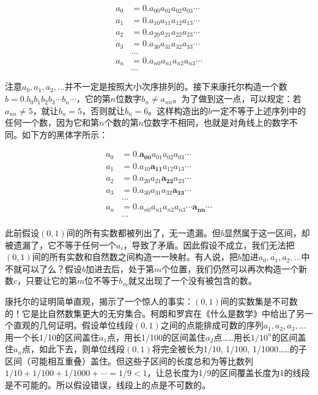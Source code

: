 \documentclass[b5paper]{ctexart}
\begin{document}
\begin{align*}
a_0 &= 0.a_{00}a_{01}a_{02}a_{03}\dotsm\\
a_1 &= 0.a_{10}a_{11}a_{12}a_{13}\dotsm\\
a_2 &= 0.a_{20}a_{21}a_{22}a_{23}\dotsm\\
a_3 &= 0.a_{30}a_{31}a_{32}a_{33}\dotsm\\
    &\dotso \\
a_n &= 0.a_{n0}a_{n1}a_{n2}a_{n3}\dotsm\\
    &\dotso
\end{align*}

注意$a_0, a_1, a_2, \dotsc$并不一定是按照大小次序排列的。接下来康托尔构造一个数$b = 0.b_0b_1b_2b_3 \dotsm b_n \dotsm$，它的第$n$位数字$b_n \neq a_{nn}$。为了做到这一点，可以规定：若$a_{nn} \neq 5$，就让$b_n = 5$，否则就让$b_n = 6$。这样构造出的$b$一定不等于上述序列中的任何一个数，因为它和第$n$个数的第$n$位数字不相同，也就是对角线上的数字不同。如下方的黑体字所示：

\begin{align*}
a_0 &= 0.\pmb{a_{00}}a_{01}a_{02}a_{03}\dotsm \\
a_1 &= 0.a_{10}\pmb{a_{11}}a_{12}a_{13}\dotsm \\
a_2 &= 0.a_{20}a_{21}\pmb{a_{22}}a_{23}\dotsm \\
a_3 &= 0.a_{30}a_{31}a_{32}\pmb{a_{33}}\dotsm \\
    &\dotso \\
a_n &= 0.a_{n0}a_{n1}a_{n2}a_{n3} \dotsm \pmb{a_{nn}}\dotsm \\
    &\dotso
\end{align*}

此前假设$(0, 1)$间的所有实数都被列出了，无一遗漏。但$b$显然属于这一区间，却被遗漏了，它不等于任何一个$a_i$，导致了矛盾。因此假设不成立，我们无法把$(0, 1)$间的所有实数和自然数之间构造一一映射。有人说，把$b$加进$a_0, a_1, a_2, \dotsc$中不就可以了么？假设$b$加进去后，处于第$m$个位置，我们仍然可以再次构造一个新数$c$，只要让它的第$m$位不等于$b_m$就又出现了一个没有被包含的数。

康托尔的证明简单直观，揭示了一个惊人的事实：$(0, 1)$间的实数集是不可数的！它是比自然数集更大的无穷集合。柯朗和罗宾在《什么是数学》中给出了另一个直观的几何证明。假设单位线段$(0, 1)$之间的点能排成可数的序列$a_1, a_2, a_3, \dotsc$用一个长1/10的区间盖住$a_1$点，用长1/100的区间盖住$a_2$点……用长$1/10^n$的区间盖住$a_n$点，如此下去，则单位线段$(0, 1)$将完全被长为1/10, 1/100, 1/1000……的子区间（可能相互重叠）盖住。但这些子区间的长度总和为等比数列$1/10 + 1/100 + 1/1000 + \dotsb = 1/9 < 1$，让总长度为1/9的区间覆盖长度为1的线段是不可能的。所以假设错误，线段上的点是不可数的\cite{Courant1969}。
\end{document}
